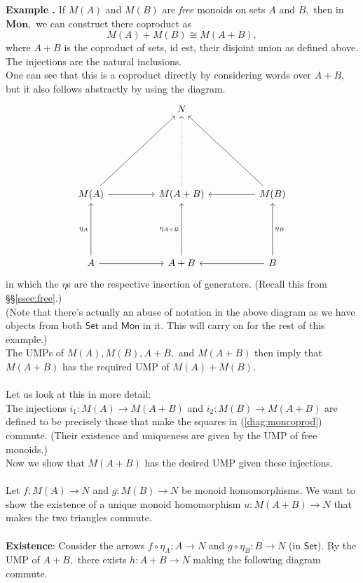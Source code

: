 \documentclass[11pt,leqno,landscape,semhelv]{seminar}
\theoremstyle{definition}
\numberwithin{joke}{section}
\numberwithin{thm}{section}
\numberwithin{equation}{section}
\newcommand{\example}[1]{\refstepcounter{thm}\par\medskip
   {\textbf{Example \thethm.} #1} \rmfamily}
\begin{document}
\example{\label{ex:freemoncop}} If $M(A)$ and $M(B)$ are \emph{free} monoids on sets $A$ and $B,$ then in $\mathbf{Mon},$ we can construct there coproduct as
\begin{equation*} 
  M(A) + M(B) \cong M(A+B),
\end{equation*}
where $A+B$ is the coproduct of sets, id est, their disjoint union as defined above.\\
The injections are the natural inclusions.\\
One can see that this is a coproduct directly by considering words over $A + B,$ but it also follows abstractly by using the diagram.
\begin{equation} \label{diag:moncoprod}
  \begin{tikzcd}
    && N&&\\&&&&\\&&&&\\&&&&\\
    M(A) \arrow[rruuuu] \arrow[rr]&  & 
    M(A+B) \arrow[uuuu, dotted]    &  & M(B) \arrow[lluuuu] \arrow[ll]
    \\&&&&\\&&&&\\
    A \arrow[uuu, "\eta_A"] \arrow[rr] &  & A+B \arrow[uuu, "\eta_{A+B}"] 
    && B \arrow[ll] \arrow[uuu, "\eta_B"']
  \end{tikzcd}
\end{equation}
in which the $\eta$s are the respective insertion of generators. (Recall this from \S\S\ref{ssec:free}.)\\
(Note that there's actually an abuse of notation in the above diagram as we have objects from both $\mathsf{Set}$ and $\mathsf{Mon}$ in it. This will carry on for the rest of this example.)\\
The UMPs of $M(A), M(B), A+B,$ and $M(A+B)$ then imply that $M(A+B)$ has the required UMP of $M(A) + M(B).$ \\~\\
%
Let us look at this in more detail:\\
The injections $i_1 : M(A) \to M(A + B)$ and $i_2 : M(B) \to M(A + B)$ are defined to be precisely those that make the squares in (\ref{diag:moncoprod}) commute. (Their existence and uniqueness are given by the UMP of free monoids.)\\
Now we show that $M(A + B)$ has the desired UMP given these injections.\\~\\
%
Let $f:M(A) \to N$ and $g:M(B) \to N$ be monoid homomorphisms. We want to show the existence of a unique monoid homomorphism $u:M(A + B) \to N$ that makes the two triangles commute.\\~\\
\textbf{Existence}: Consider the arrows $f\circ\eta_A:A\to N$ and $g\circ\eta_B:B\to N$ (in $\mathsf{Set}$). By the UMP of $A + B,$ there exists $h:A+B \to N$ making the following diagram commute.
\end{document}
